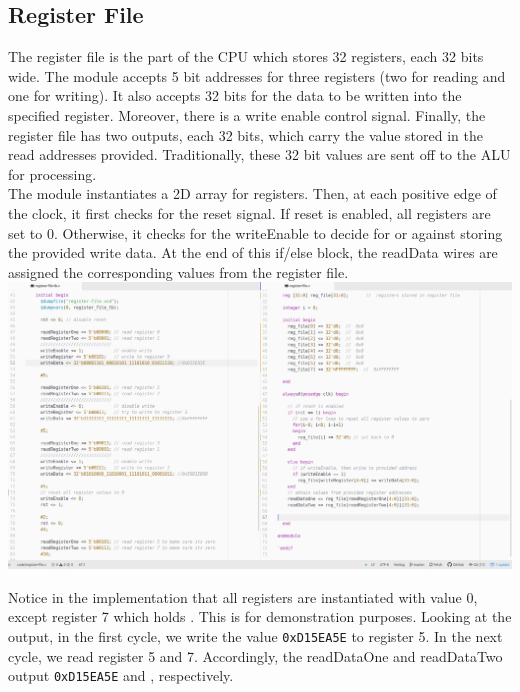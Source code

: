 \documentclass[twocolumn]{article}
\newcommand{\cc}[1]{\texttt{#1}}
\begin{document}
\newpage

\subsection{Register File}

The register file is the part of the CPU which stores 32 registers, each 32 bits wide. The module accepts 5 bit addresses for three registers (two for reading and one for writing). It also accepts 32 bits for the data to be written into the specified register. Moreover, there is a write enable control signal. Finally, the register file has two outputs, each 32 bits, which carry the value stored in the read addresses provided. Traditionally, these 32 bit values are sent off to the ALU for processing.\\ 

The module instantiates a 2D array for registers. Then, at each positive edge of the clock, it first checks for the reset signal. If reset is enabled, all registers are set to 0. Otherwise, it checks for the writeEnable to decide for or against storing the provided write data. At the end of this if/else block, the readData wires are assigned the corresponding values from the register file. \\

\begingroup
    \centering
    \medskip
    \includegraphics[width=\columnwidth]{Lab-Tex/Lab3-images/register-file.png}
    \medskip
\endgroup
\medskip

Notice in the implementation that all registers are instantiated with value 0, except register 7 which holds . This is for demonstration purposes. Looking at the output, in the first cycle, we write the value \cc{0xD15EA5E} to register 5. In the next cycle, we read register 5 and 7. Accordingly, the readDataOne and readDataTwo output \cc{0xD15EA5E} and , respectively.  \\
\end{document}
